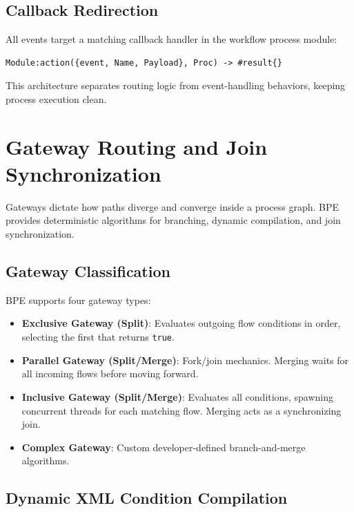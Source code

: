 \documentclass[11pt,a4paper]{article}
\begin{document}
\subsection{Callback Redirection}

All events target a matching callback handler in the workflow process module:
\begin{lstlisting}
Module:action({event, Name, Payload}, Proc) -> #result{}
\end{lstlisting}
This architecture separates routing logic from event-handling behaviors, keeping process execution clean.

\section{Gateway Routing and Join Synchronization}

Gateways dictate how paths diverge and converge inside a process graph. BPE provides deterministic algorithms for branching, dynamic compilation, and join synchronization.

\subsection{Gateway Classification}

BPE supports four gateway types:
\begin{itemize}
    \item \textbf{Exclusive Gateway (Split)}: Evaluates outgoing flow conditions in order, selecting the first that returns \texttt{true}.
    \item \textbf{Parallel Gateway (Split/Merge)}: Fork/join mechanics. Merging waits for all incoming flows before moving forward.
    \item \textbf{Inclusive Gateway (Split/Merge)}: Evaluates all conditions, spawning concurrent threads for each matching flow. Merging acts as a synchronizing join.
    \item \textbf{Complex Gateway}: Custom developer-defined branch-and-merge algorithms.
\end{itemize}

\subsection{Dynamic XML Condition Compilation}
\end{document}
